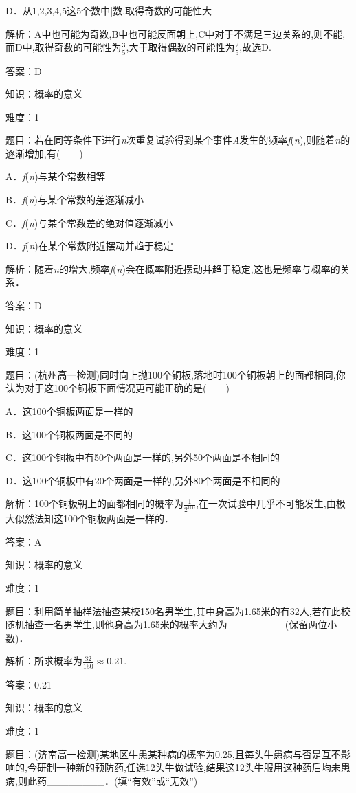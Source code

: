 \documentclass{article} %
\begin{document}
D．从1,2,3,4,5这5个数中|数,取得奇数的可能性大

解析：A中也可能为奇数,B中也可能反面朝上,C中对于不满足三边关系的,则不能,而D中,取得奇数的可能性为$\frac{3}{5}$,大于取得偶数的可能性为$\frac{2}{5}$,故选D.

答案：D

知识：概率的意义

难度：1

题目：若在同等条件下进行\textit{n}次重复试验得到某个事件\textit{A}发生的频率\textit{f}(\textit{n}),则随着\textit{n}的逐渐增加,有(　　)

A．\textit{f}(\textit{n})与某个常数相等

B．\textit{f}(\textit{n})与某个常数的差逐渐减小

C．\textit{f}(\textit{n})与某个常数差的绝对值逐渐减小

D．\textit{f}(\textit{n})在某个常数附近摆动并趋于稳定

解析：随着\textit{n}的增大,频率\textit{f}(\textit{n})会在概率附近摆动并趋于稳定,这也是频率与概率的关系．

答案：D

知识：概率的意义

难度：1

题目：(杭州高一检测)同时向上抛100个铜板,落地时100个铜板朝上的面都相同,你认为对于这100个铜板下面情况更可能正确的是(　　)

A．这100个铜板两面是一样的

B．这100个铜板两面是不同的

C．这100个铜板中有50个两面是一样的,另外50个两面是不相同的

D．这100个铜板中有20个两面是一样的,另外80个两面是不相同的

解析：100个铜板朝上的面都相同的概率为$\frac{1}{2^{100}}$,在一次试验中几乎不可能发生,由极大似然法知这100个铜板两面是一样的．

答案：A

知识：概率的意义

难度：1

题目：利用简单抽样法抽查某校150名男学生,其中身高为1.65米的有32人,若在此校随机抽查一名男学生,则他身高为1.65米的概率大约为\_\_\_\_\_\_\_\_(保留两位小数)．

解析：所求概率为$\frac{32}{150}\mathrm{\approx}0.21$.

答案：0.21

知识：概率的意义

难度：1

题目：(济南高一检测)某地区牛患某种病的概率为0.25,且每头牛患病与否是互不影响的,今研制一种新的预防药,任选12头牛做试验,结果这12头牛服用这种药后均未患病,则此药\_\_\_\_\_\_\_\_．(填``有效''或``无效'')
\end{document}
